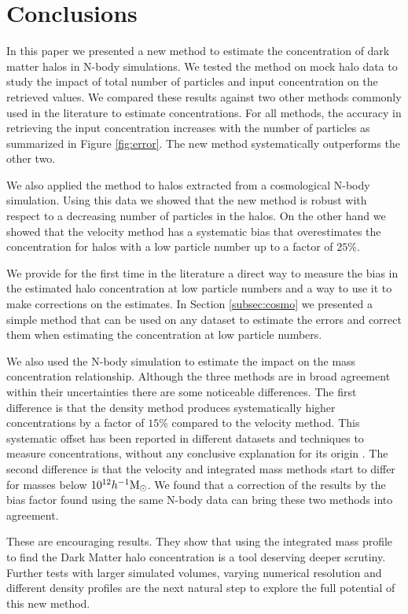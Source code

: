 \documentclass{emulateapj}
\newcommand{\hMsun}{{\ifmmode{h^{-1}{\rm {M_{\odot}}}}\else{$h^{-1}{\rm{M_{\odot}}}$}\fi}}
\begin{document}
\section{Conclusions}
\label{sec:conclusions}

In this paper we presented a new method to estimate the concentration
of dark matter halos in N-body simulations.  We tested the method on
mock halo data to study the impact of total number of particles and
input concentration on the retrieved values.  We compared these
results against two other methods commonly used in the literature to
estimate concentrations.  For all methods, the accuracy in retrieving
the input concentration increases with the number of particles as
summarized in Figure \ref{fig:error}.  The new method systematically
outperforms the other two.

We also applied the method to halos extracted from a cosmological
N-body simulation.  Using this data we showed that the new method is
robust with respect to a decreasing number of particles in the halos.
On the other hand we showed that the velocity method has a systematic
bias that overestimates the concentration for halos with a low particle
number up to a factor of $25\%$.

We provide for the first time in the literature a direct way to
measure the bias in the estimated halo concentration at low particle numbers and
a way to use it to make corrections on the estimates. 
In Section \ref{subsec:cosmo} we presented a simple method that can be used on any
dataset to estimate the errors and correct them when estimating the
concentration at low particle numbers. 

We also used the N-body simulation to estimate the impact on the mass
concentration relationship.  
Although the three methods are in broad agreement within their
uncertainties there are some noticeable differences.  
The first difference is that the density method produces
systematically higher concentrations by a factor of $15\%$ compared to
the velocity method.
This systematic offset has been reported in different datasets and
techniques to measure concentrations, without any conclusive
explanation for its origin \citep{Klypin2016}.
The second difference is that the velocity and integrated mass methods
start to differ for masses below $10^{12}\hMsun$.  
We found that a correction of the results by the bias factor found
using the same N-body data can bring these two methods into
agreement. 

These are encouraging results.  
They show that using the integrated mass profile to find the Dark
Matter halo concentration is a tool deserving deeper scrutiny.  
Further tests with larger simulated volumes, varying numerical
resolution and different density profiles are the next natural step to
explore the full potential of this new method. 
\end{document}
